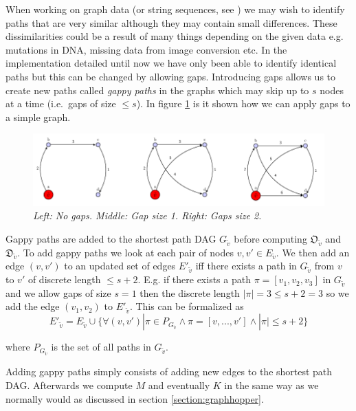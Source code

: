 \documentclass{article}
\begin{document}
When working on graph data (or string sequences, see \cite{string-kernels}) we may wish to identify paths that are very similar although they may contain small differences. These dissimilarities could be a result of many things depending on the given data e.g. mutations in DNA, missing data from image conversion etc. In the implementation detailed until now we have only been able to identify identical paths but this can be changed by allowing gaps. Introducing gaps allows us to create new paths called \textit{gappy paths} in the graphs which may skip up to $s$ nodes at a time (i.e.\ gaps of size $\leq s$). In figure \ref{fig:simple_gaps} is it shown how we can apply gaps to a simple graph.
\begin{figure}[H]
	\centering
	\includegraphics[width=12cm]{gaps}
	\caption{\textit{Left: No gaps. Middle: Gap size 1. Right: Gaps size 2.}}
	\label{fig:simple_gaps}
\end{figure}

Gappy paths are added to the shortest path DAG $G_{\tilde{v}}$ before computing $\mathfrak{O}_{\tilde{v}}$ and $\mathfrak{D}_{\tilde{v}}$. To add gappy paths we look at each pair of nodes $v,v'\in E_{\tilde{v}}$. We then add an edge $(v,v')$ to an updated set of edges $E'_{\tilde{v}}$ iff there exists a path in $G_{\tilde{v}}$ from $v$ to $v'$ of discrete length $\leq s + 2$. E.g. if there exists a path $\pi=[v_1,v_2,v_3]$ in $G_{\tilde{v}}$ and we allow gaps of size $s=1$ then the discrete length $|\pi| = 3 \leq s + 2 = 3$ so we add the edge $(v_1,v_2)$ to $E'_{\tilde{v}}$. This can be formalized as
\begin{equation}
\label{eq:gaps}
E'_{\tilde{v}} = E_{\tilde{v}} \cup \{ \forall(v, v')|\pi \in P_{G_{\tilde{v}}} \land \pi = [v,...,v'] \land |\pi| \leq s + 2 \}
\end{equation}

where $P_{G_{\tilde{v}}}$ is the set of all paths in $G_{\tilde{v}}$.

Adding gappy paths simply consists of adding new edges to the shortest path DAG. Afterwards we compute $M$ and eventually $K$ in the same way as we normally would as discussed in section \ref{section:graphhopper}.
\end{document}
